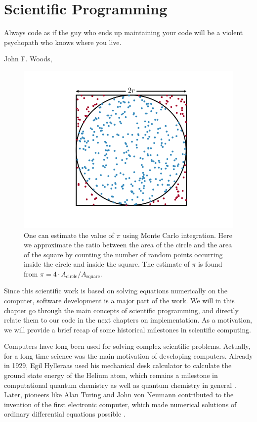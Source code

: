 \chapter{Scientific Programming} \label{chp:scientificprogramming}
\epigraph{Always code as if the guy who ends up maintaining your code will be a violent psychopath who knows where you live.}{John F. Woods, \cite{woods_usage_nodate}}
\begin{figure}[H]
	\centering
	\includegraphics[scale=0.7]{Images/montecarlointegration2.png}
	\caption{One can estimate the value of $\pi$ using Monte Carlo integration. Here we approximate the ratio between the area of the circle and the area of the square by counting the number of random points occurring inside the circle and inside the square. The estimate of $\pi$ is found from $\pi=4\cdot A_{\text{circle}}/A_{\text{square}}$.}
	\label{fig:montecarlointegration}
\end{figure}

Since this scientific work is based on solving equations numerically on the computer, software development is a major part of the work. We will in this chapter go through the main concepts of scientific programming, and directly relate them to our code in the next chapters on implementation. As a motivation, we will provide a brief recap of some historical milestones in scientific computing.

Computers have long been used for solving complex scientific problems. Actually, for a long time science was the main motivation of developing computers. Already in 1929, Egil Hylleraas used his mechanical desk calculator to calculate the ground state energy of the Helium atom, which remains a milestone in computational quantum chemistry as well as quantum chemistry in general \cite{helgaker_perspective_2000}. Later, pioneers like Alan Turing and John von Neumann contributed to the invention of the first electronic computer, which made numerical solutions of ordinary differential equations possible \cite{gustafsson_scientific_2018}. 

